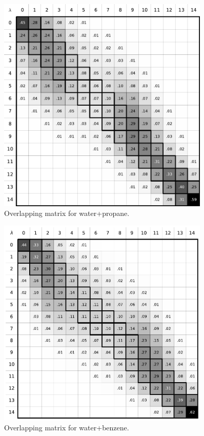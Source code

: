 \documentclass[
	12pt,				%
	openright,			%
	oneside,			%
	a4paper,			%
	english,			%
	brazil				%
	]{abntex2}
\begin{document}
\begin{apendicesenv}
\begin{figure}[H]
	\centering
	\includegraphics[width=0.9\textwidth]{Figures/owat_prop}
	\caption{Overlapping matrix for water+propane.}
\end{figure}

\begin{figure}[H]
	\centering
	\includegraphics[width=0.9\textwidth]{Figures/owat_benz}
	\caption{Overlapping matrix for water+benzene.}
\end{figure}


\end{apendicesenv}
\end{document}
